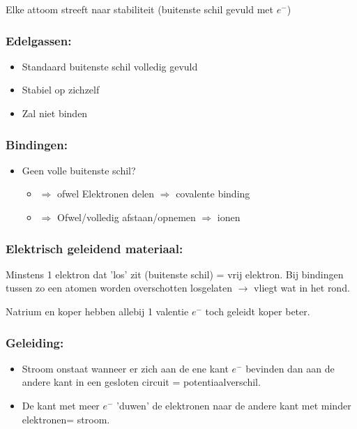 \documentclass[12pt]{article}
\begin{document}
Elke attoom streeft naar stabiliteit (buitenste schil gevuld met $e^-$)
\subsubsection{\textbf{Edelgassen:}}
\begin{itemize}
    \item Standaard buitenste schil volledig gevuld
    \item Stabiel op zichzelf
    \item Zal niet binden
\end{itemize}
\subsubsection{\textbf{Bindingen:}}
\begin{itemize}
    \item Geen volle buitenste schil?\begin{itemize}
    \item $\Rightarrow$ ofwel Elektronen delen $\Rightarrow$ covalente binding
    \item $\Rightarrow$ Ofwel/volledig afstaan/opnemen $\Rightarrow$ ionen
\end{itemize}
\end{itemize}
\subsubsection{\textbf{Elektrisch geleidend materiaal:}}
Minstens 1 elektron dat 'los' zit (buitenste schil) = vrij elektron.
Bij bindingen tussen zo een atomen worden overschotten losgelaten $\rightarrow$ vliegt wat in het rond.

Natrium en koper hebben allebij 1 valentie $e^-$ toch geleidt koper beter.
\subsubsection{\textbf{Geleiding:}}
\begin{itemize}
    \item Stroom onstaat wanneer er zich aan de ene kant $e^-$ bevinden dan aan de andere kant in een gesloten circuit = potentiaalverschil.
    \item De kant met meer $e^-$ 'duwen' de elektronen naar de andere kant met minder elektronen= stroom.
\end{itemize}
\end{document}
